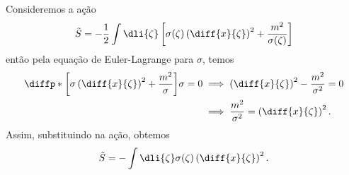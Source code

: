 Consideremos a ação
\begin{equation*}
    \tilde{S} = -\frac12 \int \dli{\zeta}\left[\sigma(\zeta)\left(\diff{x}{\zeta}\right)^2 + \frac{m^2}{\sigma(\zeta)}\right]
\end{equation*}
então pela equação de Euler-Lagrange para \(\sigma\), temos
\begin{align*}
    \diffp*{\left[\sigma\left(\diff{x}{\zeta}\right)^2 + \frac{m^2}{\sigma}\right]}{\sigma} = 0 &\implies \left(\diff{x}{\zeta}\right)^2 - \frac{m^2}{\sigma^2} = 0\\
                                                                                                &\implies \frac{m^2}{\sigma^2} = \left(\diff{x}{\zeta}\right)^2.
\end{align*}
Assim, substituindo na ação, obtemos
\begin{equation*}
    \tilde{S} = -\int\dli{\zeta} \sigma(\zeta) \left(\diff{x}{\zeta}\right)^2.
\end{equation*}
